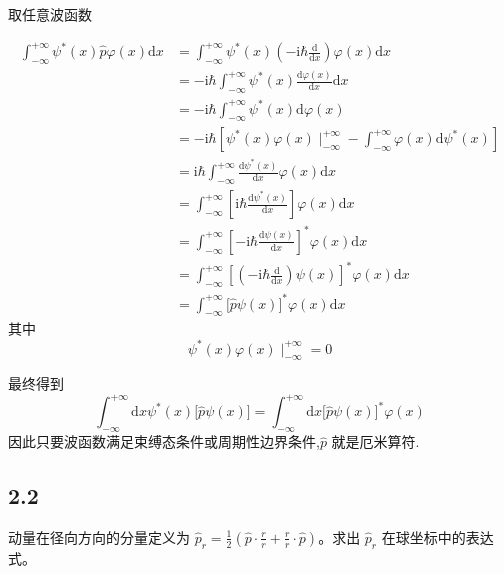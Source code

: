 取任意波函数

\begin{equation}
    \begin{aligned}
        \int_{-\infty}^{+\infty}{\psi ^*(x)\hat{p}\varphi (x)\mathrm{d}x}&=\int_{-\infty}^{+\infty}{\psi ^*(x)\left( -\mathrm{i}\hbar \frac{\mathrm{d}}{\mathrm{d}x} \right) \varphi (x)\mathrm{d}x}
\\
&=-\mathrm{i}\hbar \int_{-\infty}^{+\infty}{\psi ^*(x)\frac{\mathrm{d}\varphi (x)}{\mathrm{d}x}\mathrm{d}x}
\\
&=-\mathrm{i}\hbar \int_{-\infty}^{+\infty}{\psi ^*(x)\mathrm{d}\varphi (x)}
\\
&=-\mathrm{i}\hbar \left[ \psi ^*(x)\varphi (x)\mid_{-\infty}^{+\infty}-\int_{-\infty}^{+\infty}{\varphi (x)\mathrm{d}\psi ^*(x)} \right] 
\\
&=\mathrm{i}\hbar \int_{-\infty}^{+\infty}{\frac{\mathrm{d}\psi ^*(x)}{\mathrm{d}x}\varphi (x)\mathrm{d}x}
\\
&=\int_{-\infty}^{+\infty}{\left[ \mathrm{i}\hbar \frac{\mathrm{d}\psi ^*(x)}{\mathrm{d}x} \right] \varphi (x)\mathrm{d}x}
\\
&=\int_{-\infty}^{+\infty}{\left[ -\mathrm{i}\hbar \frac{\mathrm{d}\psi (x)}{\mathrm{d}x} \right] ^*\varphi (x)\mathrm{d}x}
\\
&=\int_{-\infty}^{+\infty}{\left[ \left( -\mathrm{i}\hbar \frac{\mathrm{d}}{\mathrm{d}x} \right) \psi (x) \right] ^*\varphi (x)\mathrm{d}x}
\\
&=\int_{-\infty}^{+\infty}{\bigl[ \hat{p}\psi (x) \bigr] ^*\varphi (x)\mathrm{d}x}
    \end{aligned}
\end{equation}
其中
\begin{equation}
    \psi ^*(x)\varphi (x)\mid_{-\infty}^{+\infty}=0
\end{equation}

最终得到
\begin{equation}
    \int_{-\infty}^{+\infty}{\mathrm{d}x}\psi ^*(x)\bigl[ \hat{p}\psi (x) \bigr] =\int_{-\infty}^{+\infty}{\mathrm{d}x}\bigl[ \hat{p}\psi (x) \bigr] ^*\varphi (x)
\end{equation}
因此只要波函数满足束缚态条件或周期性边界条件,$\hat{p}$ 就是厄米算符.

\newpage
\subsection{2.2}
动量在径向方向的分量定义为 $\hat{p}_r = \frac{1}{2} \left( \hat{p} \cdot \frac{r}{r} + \frac{r}{r} \cdot \hat{p} \right)$。求出 $\hat{p}_r$ 在球坐标中的表达式。


